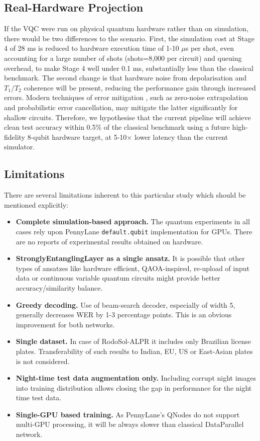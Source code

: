 \documentclass{ieeeaccess}
\begin{document}
\subsection{Real-Hardware Projection}
If the VQC were run on physical quantum hardware rather than on simulation, there would be two differences to the scenario. First, the simulation cost at Stage 4 of 28 ms is reduced to hardware execution time of 1-10 $\mu$s per shot, even accounting for a large number of shots (shots=8,000 per circuit) and queuing overhead, to make Stage 4 well under 0.1 ms, substantially less than the classical benchmark. The second change is that hardware noise from depolarisation and $T_1/T_2$ coherence will be present, reducing the performance gain through increased errors. Modern techniques of error mitigation \cite{b10}, such as zero-noise extrapolation and probabilistic error cancellation, may mitigate the latter significantly for shallow circuits. Therefore, we hypothesise that the current pipeline will achieve clean test accuracy within 0.5\% of the classical benchmark using a future high-fidelity 8-qubit hardware target, at 5-10$\times$ lower latency than the current simulator.

\subsection{Limitations}
There are several limitations inherent to this particular study which should be mentioned explicitly:
\begin{itemize}
\item \textbf{Complete simulation-based approach.} The quantum experiments in all cases rely upon PennyLane \texttt{default.qubit} implementation for GPUs. There are no reports of experimental results obtained on hardware.
\item \textbf{StronglyEntanglingLayer as a single ansatz.} It is possible that other types of ansatzes like hardware efficient, QAOA-inspired, re-upload of input data \cite{b40} or continuous variable quantum circuits \cite{b39} might provide better accuracy/similarity balance.
\item \textbf{Greedy decoding.} Use of beam-search decoder, especially of width 5, generally decreases WER by 1-3 percentage points. This is an obvious improvement for both networks.
\item \textbf{Single dataset.} In case of RodoSol-ALPR it includes only Brazilian license plates. Transferability of such results to Indian, EU, US or East-Asian plates is not considered.
\item \textbf{Night-time test data augmentation only.} Including corrupt night images into training distribution allows closing the gap in performance for the night time test data.
\item \textbf{Single-GPU based training.} As PennyLane's QNodes do not support multi-GPU processing, it will be always slower than classical DataParallel network.
\end{itemize}
\end{document}
